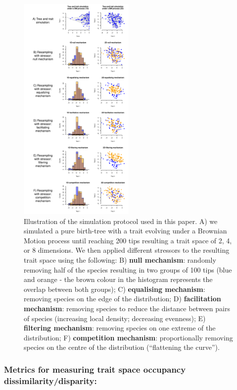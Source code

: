 \documentclass[12pt,letterpaper]{article}
\begin{document}
\begin{figure}[!htbp]
\centering
   \includegraphics[width=0.5\textwidth]{Figures/simulation_protocol.pdf}
\caption{\scriptsize{Illustration of the simulation protocol used in this paper.
A) we simulated a pure birth-tree with a trait evolving under a Brownian Motion process until reaching 200 tips resulting a trait space of 2, 4, or 8 dimensions.
We then applied different stressors to the resulting trait space using the following:
B) \textbf{null mechanism}: randomly removing half of the species resulting in two groups of 100 tips (blue and orange - the brown colour in the histogram represents the overlap between both groups);
C) \textbf{equalising mechanism}: removing species on the edge of the distribution;
D) \textbf{facilitation mechanism}: removing species to reduce the distance between pairs of species (increasing local density; decreasing evenness);
E) \textbf{filtering mechanism}: removing species on one extreme of the distribution;
F) \textbf{competition mechanism}: proportionally removing species on the centre of the distribution (``flattening the curve'').}}
\label{Fig:simulations}
\end{figure}
\bigskip

\subsubsection{Metrics for measuring trait space occupancy dissimilarity/disparity:}
\end{document}
